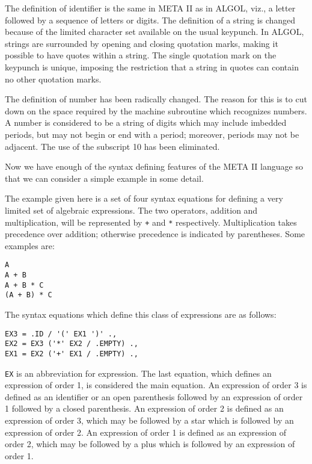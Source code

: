 \documentclass[notitlepage,twocolumn]{report}
\begin{document}
The definition of identifier is the same in META II as in ALGOL, viz.,
a letter followed by a sequence of letters or digits. The definition
of a string is changed because of the limited character set available
on the usual keypunch. In ALGOL, strings are surrounded by opening and
closing quotation marks, making it possible to have quotes within a
string. The single quotation mark on the keypunch is unique, imposing
the restriction that a string in quotes can contain no other quotation
marks.

The definition of number has been radically changed. The reason for
this is to cut down on the space required by the machine subroutine
which recognizes numbers. A number is considered to be a string of
digits which may include imbedded periods, but may not begin or end
with a period; moreover, periods may not be adjacent. The use of the
subscript 10 has been eliminated.

Now we have enough of the syntax defining features of the META II
language so that we can consider a simple example in some detail.

The example given here is a set of four syntax equations for defining
a very limited set of algebraic expressions. The two operators,
addition and multiplication, will be represented by \texttt{+} and
\texttt{*} respectively. Multiplication takes precedence over
addition; otherwise precedence is indicated by parentheses. Some
examples are:

\begin{verbatim}
A
A + B
A + B * C
(A + B) * C
\end{verbatim}

The syntax equations which define this class of expressions are as
follows:

\begin{verbatim}
EX3 = .ID / '(' EX1 ')' .,
EX2 = EX3 ('*' EX2 / .EMPTY) .,
EX1 = EX2 ('+' EX1 / .EMPTY) .,
\end{verbatim}

\texttt{EX} is an abbreviation for expression. The last equation,
which defines an expression of order 1, is considered the main
equation. An expression of order 3 is defined as an identifier or an
open parenthesis followed by an expression of order 1 followed by a
closed parenthesis. An expression of order 2 is defined as an
expression of order 3, which may be followed by a star which is
followed by an expression of order 2. An expression of order 1 is
defined as an expression of order 2, which may be followed by a plus
which is followed by an expression of order 1.
\end{document}
